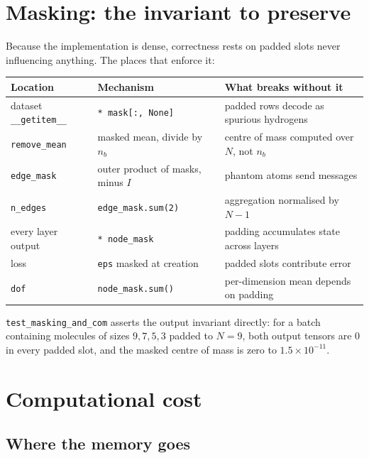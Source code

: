 \documentclass[11pt,a4paper]{article}
\newcommand{\code}[1]{\texttt{#1}}
\begin{document}
\section{Masking: the invariant to preserve}
\label{sec:masking}

Because the implementation is dense, correctness rests on padded slots never
influencing anything. The places that enforce it:

\begin{center}\small
\begin{tabular}{@{}llp{5.6cm}@{}}
\toprule
\textbf{Location} & \textbf{Mechanism} & \textbf{What breaks without it} \\
\midrule
dataset \code{\_\_getitem\_\_} & \code{* mask[:, None]} & padded rows decode as spurious hydrogens \\
\code{remove\_mean}    & masked mean, divide by $n_b$ & centre of mass computed over $N$, not $n_b$ \\
\code{edge\_mask}      & outer product of masks, minus $I$ & phantom atoms send messages \\
\code{n\_edges}        & \code{edge\_mask.sum(2)}   & aggregation normalised by $N-1$ \\
every layer output     & \code{* node\_mask}        & padding accumulates state across layers \\
loss                   & \code{eps} masked at creation & padded slots contribute error \\
\code{dof}             & \code{node\_mask.sum()}    & per-dimension mean depends on padding \\
\bottomrule
\end{tabular}
\end{center}

\noindent
\code{test\_masking\_and\_com} asserts the output invariant directly: for a batch
containing molecules of sizes $9,7,5,3$ padded to $N=9$, both output tensors are
$0$ in every padded slot, and the masked centre of mass is zero to
$1.5\times10^{-11}$.

\section{Computational cost}
\label{sec:cost}

\subsection{Where the memory goes}
\end{document}
